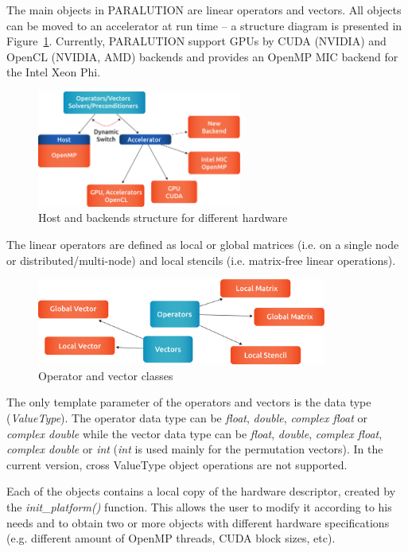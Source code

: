 The main objects in PARALUTION are linear operators and vectors. All objects can be moved to an accelerator at run time -- a structure diagram is presented in Figure~\ref{class-backends}. Currently, PARALUTION support GPUs by CUDA (NVIDIA) and OpenCL (NVIDIA, AMD) backends and provides an OpenMP MIC backend for the Intel Xeon Phi.


\begin{figure}[!ht]
\centering
\includegraphics[width=0.6\textwidth]{./fig/structure.pdf}
\caption{Host and backends structure for different hardware}
\label{class-backends}
\end{figure}


The linear operators are defined as local or global matrices (i.e. on a single node or distributed/multi-node) and local stencils (i.e. matrix-free linear operations). 

\begin{figure}[!ht]
\centering
\includegraphics[width=0.85\textwidth]{./fig/operators.pdf}
\caption{Operator and vector classes}
\label{paralution-lib}
\end{figure}


The only template parameter of the operators and vectors is the data type (\emph{ValueType}). The operator data type can be \emph{float}, \emph{double}, \emph{complex float} or \emph{complex double} while the vector data type can be \emph{float}, \emph{double}, \emph{complex float}, \emph{complex double} or \emph{int} (\emph{int} is used mainly for the permutation vectors). In the current version, cross ValueType object operations are not supported.


Each of the objects contains a local copy of the hardware descriptor, created by the \emph{init\_platform()} function. This allows the user to modify it according to his needs and to obtain two or more objects with different hardware specifications (e.g. different amount of OpenMP threads, CUDA block sizes, etc).

